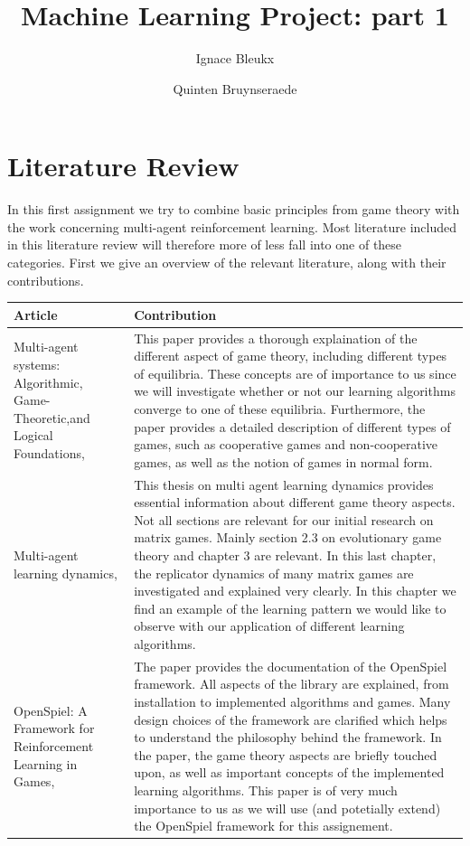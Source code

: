 \documentclass[10pt,a4paper]{article}
\author{Ignace Bleukx \and Quinten Bruynseraede}
\title{Machine Learning Project: part 1}
\begin{document}
\maketitle

\section{Literature Review}
In this first assignment we try to combine basic principles from game theory with the work concerning multi-agent reinforcement learning. Most literature included in this literature review will therefore more of less fall into one of these categories. First we give an overview of the relevant literature, along with their contributions.


\bigskip
\begin{longtable}{|p{4cm}|p{12cm}|}
\hline 
Article & Contribution \\ 
\hline 
\hline
Multi-agent systems: Algorithmic, Game-Theoretic,and Logical Foundations, \citet{mas} & This paper provides a thorough explaination of the different aspect of game theory, including different types of equilibria. These concepts are of importance to us since we will investigate whether or not our learning algorithms converge to one of these equilibria. Furthermore, the paper provides a detailed description of different types of games, such as cooperative games and non-cooperative games, as well as the notion of games in normal form.   \\ 
\hline 
Multi-agent learning dynamics, \citet{phdthesis} &  This thesis on multi agent learning dynamics provides essential information about different game theory aspects. Not all sections are relevant for our initial research on matrix games. Mainly section 2.3 on evolutionary game theory and chapter 3 are relevant. In this last chapter, the replicator dynamics of many matrix games are investigated and explained very clearly. In this chapter we find an example of the learning pattern we would like to observe with our application of different learning algorithms.   \\
\hline 
OpenSpiel: A Framework for Reinforcement Learning in Games, \citet{lanctot2019openspiel} & The paper provides the documentation of the OpenSpiel framework. All aspects of the library are explained, from installation to implemented algorithms and games. Many design choices of the framework are clarified which helps to understand the philosophy behind the framework. In the paper, the game theory aspects are briefly touched upon, as well as important concepts of the implemented learning algorithms. This paper is of very much importance to us as we will use (and potetially extend) the OpenSpiel framework for this assignement. \\ 

\end{longtable}
\end{document}
